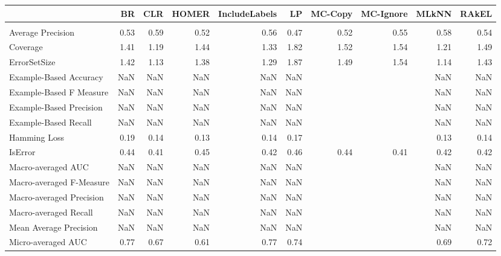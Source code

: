 \begin{tabular}{l|rrrrrrrrr}

  & BR & CLR & HOMER & IncludeLabels & LP & MC-Copy & MC-Ignore & MLkNN & RAkEL \\

\hline \\

Average Precision & 0.53 & 0.59 & 0.52 & 0.56 & 0.47 & 0.52 & 0.55 & 0.58 & 0.54 \\

Coverage & 1.41 & 1.19 & 1.44 & 1.33 & 1.82 & 1.52 & 1.54 & 1.21 & 1.49 \\

ErrorSetSize & 1.42 & 1.13 & 1.38 & 1.29 & 1.87 & 1.49 & 1.54 & 1.14 & 1.43 \\

Example-Based Accuracy & NaN & NaN & NaN & NaN & NaN &  &  & NaN & NaN \\

Example-Based F Measure & NaN & NaN & NaN & NaN & NaN &  &  & NaN & NaN \\

Example-Based Precision & NaN & NaN & NaN & NaN & NaN &  &  & NaN & NaN \\

Example-Based Recall & NaN & NaN & NaN & NaN & NaN &  &  & NaN & NaN \\

Hamming Loss & 0.19 & 0.14 & 0.13 & 0.14 & 0.17 &  &  & 0.13 & 0.14 \\

IsError & 0.44 & 0.41 & 0.45 & 0.42 & 0.46 & 0.44 & 0.41 & 0.42 & 0.42 \\

Macro-averaged AUC & NaN & NaN & NaN & NaN & NaN &  &  & NaN & NaN \\

Macro-averaged F-Measure & NaN & NaN & NaN & NaN & NaN &  &  & NaN & NaN \\

Macro-averaged Precision & NaN & NaN & NaN & NaN & NaN &  &  & NaN & NaN \\

Macro-averaged Recall & NaN & NaN & NaN & NaN & NaN &  &  & NaN & NaN \\

Mean Average Precision & NaN & NaN & NaN & NaN & NaN &  &  & NaN & NaN \\

Micro-averaged AUC & 0.77 & 0.67 & 0.61 & 0.77 & 0.74 &  &  & 0.69 & 0.72 \\


\end{tabular}
